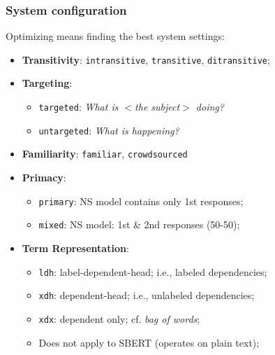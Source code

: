 \documentclass[handout,xcolor={dvipsnames}]{beamer}
\newcommand{\param}[1]{\texttt{#1}}
\begin{document}
\begin{frame}
\frametitle{System configuration}
\small

\vspace{.8em}
Optimizing means finding the best system settings:

\begin{itemize}
\pause
\item \textbf{Transitivity}: \param{intransitive}, \param{transitive}, \param{ditransitive};
\pause
\item \textbf{Targeting}: 
\begin{itemize}
\item \param{targeted}: \textit{What is $<$the subject$>$ doing?}
\item \param{untargeted}: \textit{What is happening?}
\end{itemize}
\pause
\item \textbf{Familiarity}: \param{familiar}, \param{crowdsourced}
\pause
\item \textbf{Primacy}:
\begin{itemize}
\item \param{primary}: NS model contains only 1st responses;
\item \param{mixed}: NS model: 1st \& 2nd responses (50-50);
\end{itemize}
\pause
\item \textbf{Term Representation}:
\begin{itemize}
\item \param{ldh}: label-dependent-head; i.e., labeled dependencies;
\item \param{xdh}: dependent-head; i.e., unlabeled dependencies;
\item \param{xdx}: dependent only; cf. \textit{bag of words};
\item Does not apply to SBERT (operates on plain text);
\end{itemize}
\end{itemize}
\end{frame}
\end{document}
